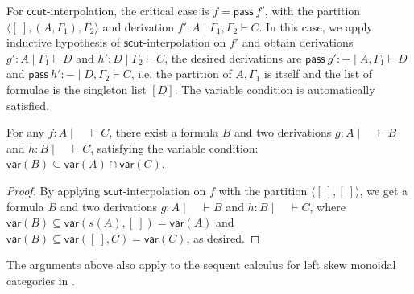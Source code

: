 \documentclass[a4paper,UKenglish,cleveref, autoref, thm-restate, anonymous]{lipics-v2021}
\newcommand{\GG}{\Gamma}
\newcommand{\pass}{\mathsf{pass}}
\newcommand{\lolli}{\multimap}
\newcommand{\lleft}{{\lolli}\mathsf{L}}
\newcommand{\vdG}{\vdash}
\newcommand{\mf}[1]{\mathsf{#1}}
\newcommand{\vars}[1]{\mathsf{var}(#1)}
\begin{document}
For $\mf{ccut}$-interpolation, the critical case is $f = \pass \ f'$, with the partition $\langle [\ ], (A, \GG_1) , \GG_2 \rangle$ and derivation $f' : A \mid \GG_1 , \GG_2 \vdG C$.
In this case, we apply inductive hypothesis of $\mf{scut}$-interpolation on $f'$ and obtain derivations $g': A \mid \GG_1 \vdG D$ and $h' : D \mid \GG_2 \vdG C$, the desired derivations are $\pass \ g' : {-} \mid A , \GG_1 \vdG D$ and $\pass \ h' : {-} \mid D, \GG_2 \vdG C$, i.e. the partition of $A, \GG_1$ is itself and the list of formulae is the singleton list $[D]$.
The variable condition is automatically satisfied.
\begin{theorem}
  For any $f: A \mid \quad \vdG C$, there exist a formula $B$ and two derivations $g: A\mid \quad \vdash B$ and $h: B\mid \quad \vdash C$, satisfying the variable condition: $\vars{B} \subseteq \vars{A} \cap \vars{C}$.
\end{theorem}
\begin{proof}
  By applying $\mf{scut}$-interpolation on $f$ with the partition $\langle [\ ], [\ ]\rangle$, we get a formula $B$ and two derivations $g: A \mid \quad \vdG B$ and $h: B \mid \quad \vdG C$, where $\vars{B}\subseteq \vars{s(A), [\ ]} = \vars{A}$ and $\vars{B} \subseteq \vars{[\ ], C} = \vars{C}$, as desired. 
\end{proof}
The arguments above also apply to the sequent calculus for left skew monoidal categories in \cite{uustalu:sequent:2021}.
\end{document}
